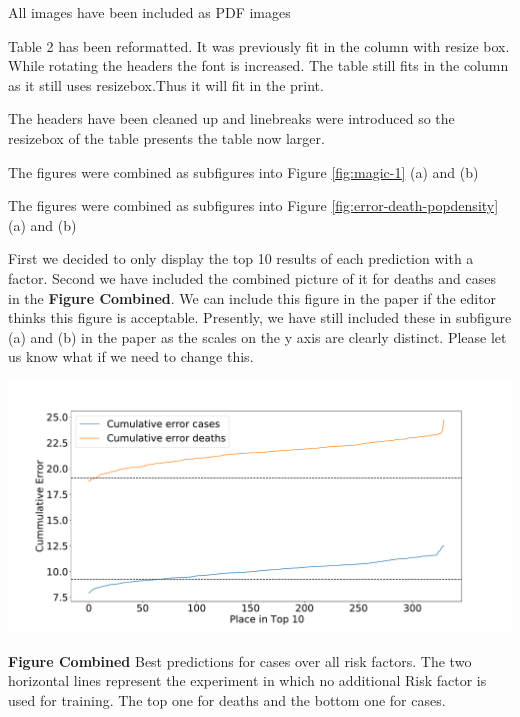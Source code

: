   {All images have been included as PDF images}


  { Table 2 has been reformatted. It was previously fit in the column
    with resize box. While rotating the headers the font is
    increased. The table still fits in the column as it still uses
    resizebox.Thus it will fit in the print.}

  { The headers have been cleaned up and linebreaks were introduced so
    the resizebox of the table presents the table now larger.} 

  {The figures were combined as subfigures into Figure \ref{fig:magic-1} (a) and (b)}


    {The figures were combined as subfigures into Figure \ref{fig:error-death-popdensity} (a) and (b)}


  {


First we decided to only display the top 10 results of each prediction
with a factor. Second we have included the combined picture of it for
deaths and cases in the {\bf Figure Combined}. We can include this
figure in the paper if the editor thinks this figure is acceptable. Presently, we have still included these in  subfigure
(a) and (b) in the paper as the scales on the y axis are
clearly distinct. Please let us know what if we need to change this.

{
        \centering
        \includegraphics[width=.9\textwidth]{images/predict/PlaceTop10_CasesAndDeathNEW2.pdf}
        
        {\bf Figure Combined} Best predictions for cases over all risk factors.
The two horizontal lines represent the experiment in which no additional Risk factor is used for training. The top one for deaths and the bottom one for cases.}        


}



